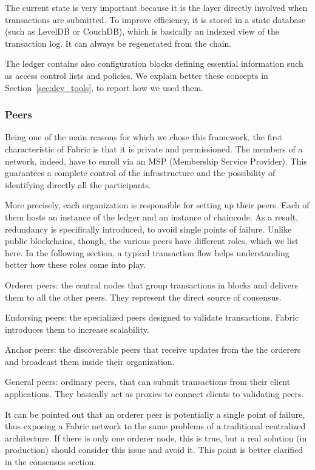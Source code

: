 The current state is very important because it is the layer directly involved when transactions are submitted. To improve efficiency, it is stored in a state database (such as LevelDB or CouchDB), which is basically an indexed view of the transaction log. It can always be regenerated from the chain.

The ledger contains also configuration blocks defining essential information such as access control lists and policies. We explain better these concepts in Section~\ref{sec:dev_tools}, to report how we used them.

\subsubsection{Peers}
Being one of the main reasons for which we chose this framework, the first characteristic of Fabric is that it is private and permissioned. The members of a network, indeed, have to enroll via an MSP (Membership Service Provider). This guarantees a complete control of the infrastructure and the possibility of identifying directly all the participants.

More precisely, each organization is responsible for setting up their peers. Each of them hosts an instance of the ledger and an instance of chaincode. As a result, redundancy is specifically introduced, to avoid single points of failure. Unlike public blockchains, though, the various peers have different roles, which we list here. In the following section, a typical transaction flow helps understanding better how these roles come into play.

\begin{description}
    \item Orderer peers: the central nodes that group transactions in blocks and delivers them to all the other peers. They represent the direct source of consensus.
    \item Endorsing peers: the specialized peers designed to validate transactions. Fabric introduces them to increase scalability.
    \item Anchor peers: the discoverable peers that receive updates from the the orderers and broadcast them inside their organization.
    \item General peers: ordinary peers, that can submit transactions from their client applications. They basically act as proxies to connect clients to validating peers.
\end{description}

It can be pointed out that an orderer peer is potentially a single point of failure, thus exposing a Fabric network to the same problems of a traditional centralized architecture. If there is only one orderer node, this is true, but a real solution (in production) should consider this issue and avoid it. This point is better clarified in the consensus section.

